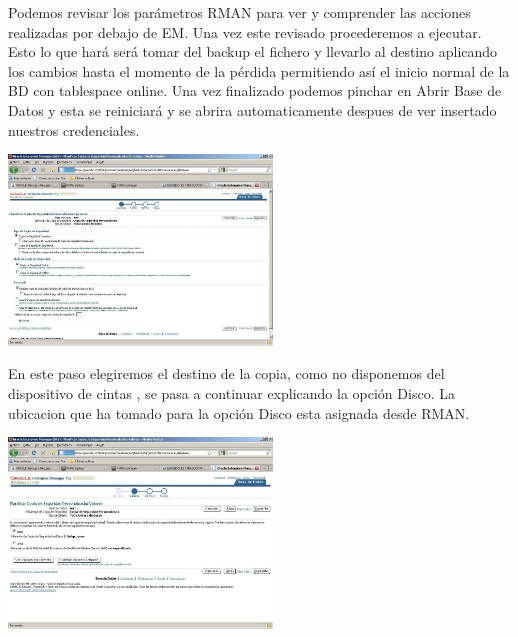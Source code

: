 \documentclass[a4paper,twocolumn,10pt]{article}
\begin{document}
           \normalsize Podemos revisar los par\'ametros RMAN para ver y comprender las acciones realizadas por debajo de EM. Una vez este revisado procederemos a ejecutar. 
 Esto lo que har\'a ser\'a tomar del backup el fichero y llevarlo al destino aplicando los cambios hasta el momento de la p\'erdida permitiendo as\'i el inicio normal de la BD con tablespace online. 
Una vez finalizado podemos pinchar en Abrir Base de Datos y esta se reiniciar\'a y se abrira automaticamente despues de ver insertado nuestros credenciales.\\ 
\begin{center}
\includegraphics[width=7cm]{./Imagenes/eje1.jpg}
 \end{center}
 En este paso elegiremos el destino de la copia, como no disponemos del dispositivo de cintas , se pasa a continuar explicando la opci\'on Disco. La ubicacion que ha tomado para la opci\'on 
Disco esta asignada desde RMAN.
\begin{center}
\includegraphics[width=7cm]{./Imagenes/eje2.jpg}
\end{center}
\end{document}
